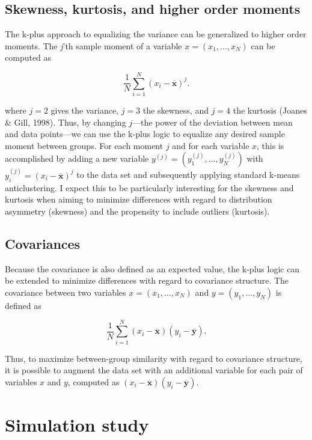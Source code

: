 \documentclass[
  man,floatsintext]{apa7}
\begin{document}
\hypertarget{skewness-kurtosis-and-higher-order-moments}{%
\subsection{Skewness, kurtosis, and higher order moments}\label{skewness-kurtosis-and-higher-order-moments}}

The k-plus approach to equalizing the variance can be generalized to higher order moments. The \emph{j}'th sample moment of a variable \(x = (x_1, \ldots, x_N)\) can be computed as

\[
\frac{1}{N} \sum\limits_{i=1}^{N} (x_i - \overline{\mathbf{x}})^j.
\]

where \(j = 2\) gives the variance, \(j = 3\) the skewness, and \(j = 4\) the kurtosis (Joanes \& Gill, 1998). Thus, by changing \(j\)---the power of the deviation between mean and data points---we can use the k-plus logic to equalize any desired sample moment between groups. For each moment \(j\) and for each variable \(x\), this is accomplished by adding a new variable \(y^{(j)} = (y^{(j)}_1, \ldots, y^{(j)}_N)\) with \(y^{(j)}_i = (x_i - \overline{\mathbf{x}})^j\) to the data set and subsequently applying standard k-means anticlustering. I expect this to be particularly interesting for the skewness and kurtosis when aiming to minimize differences with regard to distribution asymmetry (skewness) and the propensity to include outliers (kurtosis).

\hypertarget{covariances}{%
\subsection{Covariances}\label{covariances}}

Because the covariance is also defined as an expected value, the k-plus logic can be extended to minimize differences with regard to covariance structure. The covariance between two variables \(x = (x_1, \ldots, x_N)\) and \(y = (y_1, \ldots, y_N)\) is defined as

\[
\frac{1}{N} \sum\limits_{i=1}^{N} (x_i - \overline{\mathbf{x}}) (y_i -\overline{\mathbf{y}}).
\]

Thus, to maximize between-group similarity with regard to covariance structure, it is possible to augment the data set with an additional variable for each pair of variables \(x\) and \(y\), computed as \((x_i - \overline{\mathbf{x}}) (y_i -\overline{\mathbf{y}})\).

\hypertarget{simulation-study}{%
\section{Simulation study}\label{simulation-study}}
\end{document}

